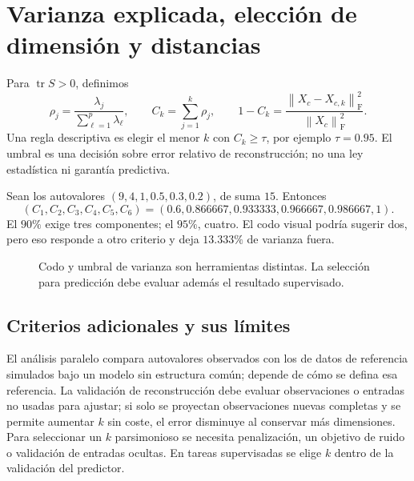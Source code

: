 \documentclass[11pt,a4paper]{article}
\newcommand{\norm}[1]{\left\lVert #1\right\rVert}
\DeclareMathOperator{\tr}{tr}
\newcommand{\F}{_{\mathrm F}}
\theoremstyle{definition}
\begin{document}
\section{Varianza explicada, elección de dimensión y distancias}
Para $\tr S>0$, definimos
\[
\rho_j=\frac{\lambda_j}{\sum_{\ell=1}^p\lambda_\ell},\qquad
C_k=\sum_{j=1}^k\rho_j,\qquad
1-C_k=\frac{\norm{X_c-X_{c,k}}\F^2}{\norm{X_c}\F^2}.
\]
Una regla descriptiva es elegir el menor $k$ con $C_k\ge\tau$, por ejemplo $\tau=0.95$. El umbral es una decisión sobre error relativo de reconstrucción; no una ley estadística ni garantía predictiva.
\begin{ejemplo}
Sean los autovalores $(9,4,1,0.5,0.3,0.2)$, de suma $15$. Entonces
\[
(C_1,C_2,C_3,C_4,C_5,C_6)=(0.6,0.866667,0.933333,0.966667,0.986667,1).
\]
El $90\%$ exige tres componentes; el $95\%$, cuatro. El codo visual podría sugerir dos, pero eso responde a otro criterio y deja $13.333\%$ de varianza fuera.
\end{ejemplo}
\begin{figure}[H]\centering
{}\hfill
{}
\caption{Codo y umbral de varianza son herramientas distintas. La selección para predicción debe evaluar además el resultado supervisado.}
\end{figure}
\subsection{Criterios adicionales y sus límites}
El análisis paralelo compara autovalores observados con los de datos de referencia simulados bajo un modelo sin estructura común; depende de cómo se defina esa referencia. La validación de reconstrucción debe evaluar observaciones o entradas no usadas para ajustar; si solo se proyectan observaciones nuevas completas y se permite aumentar $k$ sin coste, el error disminuye al conservar más dimensiones. Para seleccionar un $k$ parsimonioso se necesita penalización, un objetivo de ruido o validación de entradas ocultas. En tareas supervisadas se elige $k$ dentro de la validación del predictor.
\end{document}
